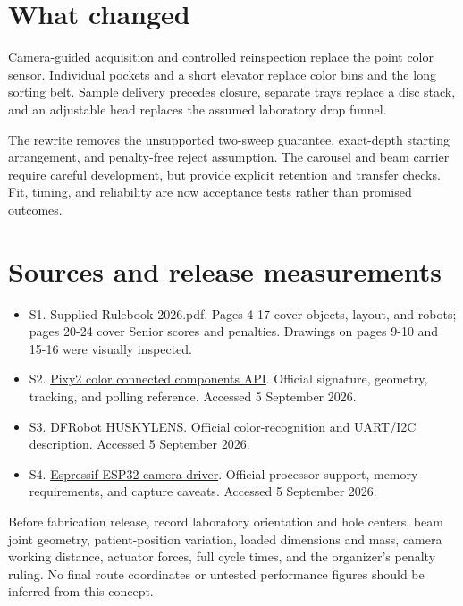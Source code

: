 \documentclass[10pt,a4paper]{article}
\begin{document}
\section{What changed}
Camera-guided acquisition and controlled reinspection replace the point color sensor. Individual pockets and a short elevator replace color bins and the long sorting belt. Sample delivery precedes closure, separate trays replace a disc stack, and an adjustable head replaces the assumed laboratory drop funnel.

The rewrite removes the unsupported two-sweep guarantee, exact-depth starting arrangement, and penalty-free reject assumption. The carousel and beam carrier require careful development, but provide explicit retention and transfer checks. Fit, timing, and reliability are now acceptance tests rather than promised outcomes.

\section{Sources and release measurements}
\begin{itemize}
\item S1. Supplied Rulebook-2026.pdf. Pages 4-17 cover objects, layout, and robots; pages 20-24 cover Senior scores and penalties. Drawings on pages 9-10 and 15-16 were visually inspected.
\item S2. \href{https://docs.pixycam.com/wiki/doku.php?id=wiki:v2:ccc_api}{Pixy2 color connected components API}. Official signature, geometry, tracking, and polling reference. Accessed 5 September 2026.
\item S3. \href{https://www.dfrobot.com/huskylens/huskylens}{DFRobot HUSKYLENS}. Official color-recognition and UART/I2C description. Accessed 5 September 2026.
\item S4. \href{https://github.com/espressif/esp32-camera}{Espressif ESP32 camera driver}. Official processor support, memory requirements, and capture caveats. Accessed 5 September 2026.
\end{itemize}
Before fabrication release, record laboratory orientation and hole centers, beam joint geometry, patient-position variation, loaded dimensions and mass, camera working distance, actuator forces, full cycle times, and the organizer's penalty ruling. No final route coordinates or untested performance figures should be inferred from this concept.
\end{document}
